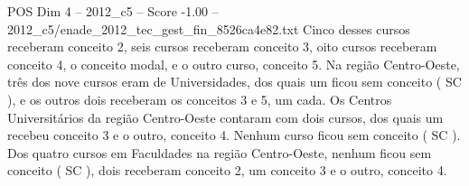 \begin{textsample}{POS Dim 4 – 2012\_c5 – Score -1.00 – 2012\_c5/enade\_2012\_tec\_gest\_fin\_8526ca4e82.txt}
Cinco desses cursos receberam conceito 2, seis cursos receberam conceito 3, oito cursos receberam conceito 4, o conceito modal, e o outro curso, conceito 5.
Na região Centro-Oeste, três dos nove cursos eram de Universidades, dos quais um ficou sem conceito ( SC ), e os outros dois receberam os conceitos 3 e 5, um cada.
Os Centros Universitários da região Centro-Oeste contaram com dois cursos, dos quais um recebeu conceito 3 e o outro, conceito 4.
Nenhum curso ficou sem conceito ( SC ).
Dos quatro cursos em Faculdades na região Centro-Oeste, nenhum ficou sem conceito ( SC ), dois receberam conceito 2, um conceito 3 e o outro, conceito 4.

\end{textsample}
